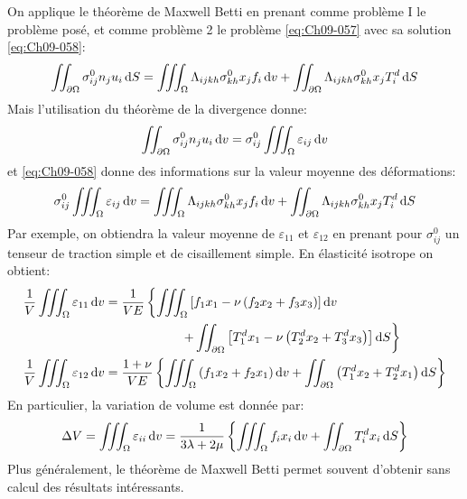 On applique le théorème de Maxwell Betti en prenant comme problème I  le problème posé, et comme problème 2 le problème \eqref{eq:Ch09-057} avec sa solution \eqref{eq:Ch09-058}:
\[
\iint_{\partial \Omega} \sigma_{ij}^0 n_j u_i \mathop{\mathrm{{}d}}\mathopen{} S = \iiint_{\Omega} \Lambda_{ijkh} \sigma_{kh}^0 x_j f_i \mathop{\mathrm{{}d}}\mathopen{} v + \iint_{\partial \Omega} \Lambda_{ijkh} \sigma_{kh}^0 x_j T_i^d \mathop{\mathrm{{}d}}\mathopen{} S
\]
Mais l'utilisation du théorème de la divergence donne: 
\[
\iint_{\partial \Omega} \sigma_{ij}^0 n_j u_i \mathop{\mathrm{{}d}}\mathopen{} v = \sigma_{ij}^0 \iiint_{\Omega} \varepsilon_{ij} \mathop{\mathrm{{}d}}\mathopen{} v
\]
et \eqref{eq:Ch09-058} donne des informations sur la valeur moyenne des déformations: 
\begin{equation}
    \sigma_{ij}^0 \iiint_{\Omega} \varepsilon_{ij} \mathop{\mathrm{{}d}}\mathopen{} v = \iiint_{\Omega} \Lambda_{ijkh} \sigma_{kh}^0 x_j f_i \mathop{\mathrm{{}d}}\mathopen{} v + \iint_{\partial \Omega} \Lambda_{ijkh} \sigma_{kh}^0 x_j T_i^d \mathop{\mathrm{{}d}}\mathopen{} S
    \label{eq:Ch09-059}
\end{equation}
Par exemple, on obtiendra la valeur moyenne de $\varepsilon_{11}$ et $\varepsilon_{12}$ en prenant pour $\sigma_{ij}^0$ un tenseur de traction simple et de cisaillement simple.
En élasticité isotrope on obtient:
\begin{equation}
    \begin{aligned}
        \frac{1}{V} \iiint_{\Omega} \varepsilon_{11} \mathop{\mathrm{{}d}}\mathopen{} v &= \frac{1}{VE} \left\{ \iiint_{\Omega} \left[ f_1 x_1 - \nu \left( f_2 x_2 + f_3 x_3 \right) \right] \mathop{\mathrm{{}d}}\mathopen{} v\right.\\&\qquad\qquad\qquad\left. + \iint_{\partial \Omega} \left[ T_1^d x_1 - \nu \left( T_2^d x_2 + T_3^d x_3 \right) \right] \mathop{\mathrm{{}d}}\mathopen{} S \right\} \\
        \frac{1}{V} \iiint_{\Omega} \varepsilon_{12} \mathop{\mathrm{{}d}}\mathopen{} v &=\frac{1+ \nu}{VE} \left\{ \iiint_{\Omega} \left( f_1 x_2 + f_2 x_1 \right) \mathop{\mathrm{{}d}}\mathopen{} v + \iint_{\partial \Omega} \left( T_1^d x_2 + T_2^d x_1 \right) \mathop{\mathrm{{}d}}\mathopen{} S \right\}
    \end{aligned}
    \label{eq:Ch09-060}
\end{equation}
En particulier, la variation de volume est donnée par: 
\begin{equation}
    \Delta V = \iiint_{\Omega} \varepsilon_{ii} \mathop{\mathrm{{}d}}\mathopen{} v = \frac{1}{3\lambda+2\mu} \left\{ \iiint_{\Omega} f_i x_i \mathop{\mathrm{{}d}}\mathopen{} v + \iint_{\partial \Omega} T_i^d x_i \mathop{\mathrm{{}d}}\mathopen{} S \right\}
    \label{eq:Ch09-061}
\end{equation}
Plus généralement, le théorème de Maxwell Betti permet souvent d'obtenir sans calcul des résultats intéressants. 

